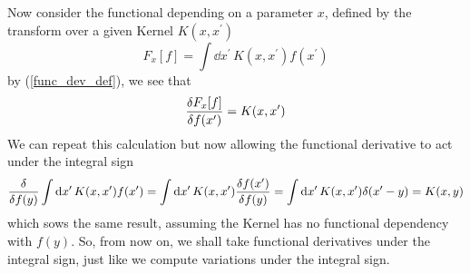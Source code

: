Now consider the functional depending on a parameter $x$, defined by the transform over a given Kernel $K(x,x^\prime)$
\begin{equation}
    F_x[f]=\int\dd x^\prime\,K(x,x^\prime)f(x^\prime)
\end{equation}
by (\ref{func_dev_def}), we see that
\begin{equation}
    \fdv{F_x[f]}{f(x^\prime)}=K(x,x^\prime)
\end{equation}
We can repeat this calculation but now allowing the functional derivative to act under the integral sign
\begin{equation}
    \fdv{f(y)}\int\dd x^\prime\,K(x,x^\prime)f(x^\prime)=\int\dd x^\prime\,K(x,x^\prime)\fdv{f(x^\prime)}{f(y)}=\int\dd x^\prime\,K(x,x^\prime)\delta(x^\prime-y)=K(x,y)
\end{equation}
which sows the same result, assuming the Kernel has no functional dependency with $f(y)$. So, from now on, we shall take functional derivatives under the integral sign, just like we compute variations under the integral sign. \\

